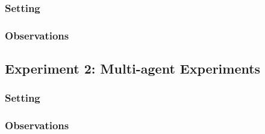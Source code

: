 \documentclass[11pt]{article}
\begin{document}
\subsubsection{Setting}

\subsubsection{Observations}


\subsection{Experiment 2: Multi-agent Experiments}

\subsubsection{Setting}

\subsubsection{Observations}
\end{document}
